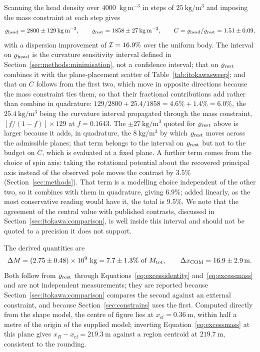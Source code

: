 Scanning the head density over $4000$~kg\,m$^{-3}$ in steps of
$\SI{25}{\kilo\gram\per\cubic\metre}$ and imposing the mass constraint at
each step gives
%
\begin{equation}
\varrho_{\mathrm{head}} = 2800 \pm \SI{129}{\kilo\gram\per\cubic\metre},
\qquad
\varrho_{\mathrm{rest}} = 1858 \pm \SI{27}{\kilo\gram\per\cubic\metre},
\qquad
C = \varrho_{\mathrm{head}}/\varrho_{\mathrm{rest}} = 1.51 \pm 0.09 ,
\label{eq:itokawaref}
\end{equation}
%
with a dispersion improvement of $\mathcal{I} = 16.9\%$ over the uniform
body. The interval on $\varrho_{\mathrm{head}}$ is the curvature sensitivity interval
defined in Section~\ref{sec:methods:minimisation}, not a confidence
interval; that on $\varrho_{\mathrm{rest}}$ combines it with the plane-placement
scatter of Table~\ref{tab:itokawasweep}; and that on $C$ follows from the
first two, which move in opposite directions because the mass constraint
ties them, so that their fractional contributions add rather than combine
in quadrature: $129/2800 + 25.4/1858 = 4.6\% + 1.4\% = 6.0\%$, the
$\SI{25.4}{\kilo\gram\per\cubic\metre}$ being the curvature interval
propagated through the mass constraint, $[f/(1-f)]\times129$ at
$f = 0.1643$. The $\pm\SI{27}{\kilo\gram\per\cubic\metre}$ quoted for
$\varrho_{\mathrm{rest}}$ above is larger because it adds, in quadrature, the
$\SI{8}{\kilo\gram\per\cubic\metre}$ by which $\varrho_{\mathrm{rest}}$ moves across the
admissible planes; that term belongs to the interval on $\varrho_{\mathrm{rest}}$ but not
to the budget on $C$, which is evaluated at a fixed plane. A further
term comes from the choice of spin axis: taking the rotational potential about
the recovered principal axis instead of the observed pole moves the contrast
by $3.5\%$ (Section~\ref{sec:methods}). That term is a modelling choice
independent of the other two, so it combines with them in quadrature, giving
$6.9\%$; added linearly, as the most conservative reading would have it, the
total is $9.5\%$. We note
that the agreement of the central value with published contrasts,
discussed in Section~\ref{sec:itokawa:comparison}, is well inside this
interval and should not be quoted to a precision it does not support.

The derived quantities are
%
\begin{equation}
\Delta M = (2.75 \pm 0.48)\times10^{9}~\mathrm{kg}
       = 7.7 \pm 1.3\%~\text{of}~M_{\mathrm{tot}} ,
\qquad
\Delta x_{\mathrm{COM}} = 16.9 \pm \SI{2.9}{\metre} .
\label{eq:itokawaderived}
\end{equation}
%
Both follow from $\varrho_{\mathrm{rest}}$ through
Equations~\eqref{eq:excessidentity} and~\eqref{eq:excessmass} and are not
independent measurements; they are reported because
Section~\ref{sec:itokawa:comparison} compares the second against an
external constraint, and because Section~\ref{sec:constrains} uses the
first. Computed directly from the shape model, the centre of figure lies at
$x_{\mathrm{cf}} = \SI{0.36}{\metre}$, within half a metre of the origin of
the supplied model; inverting Equation~\eqref{eq:excessmass} at this plane
gives $x_R - x_{\mathrm{cf}} = \SI{219.3}{\metre}$ against a region centroid
at $\SI{219.7}{\metre}$, consistent to the rounding.


